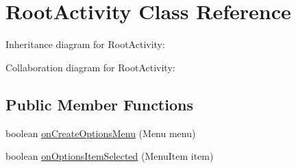 \hypertarget{classcom_1_1axcoto_1_1shinjuku_1_1sushi_1_1_root_activity}{\section{\-Root\-Activity \-Class \-Reference}
\label{classcom_1_1axcoto_1_1shinjuku_1_1sushi_1_1_root_activity}
}


\-Inheritance diagram for \-Root\-Activity\-:


\-Collaboration diagram for \-Root\-Activity\-:
\subsection*{\-Public \-Member \-Functions}
\begin{DoxyCompactItemize}
\item 
boolean \hyperlink{classcom_1_1axcoto_1_1shinjuku_1_1sushi_1_1_root_activity_a8f7d87763ddaf085205a54e8477ecfce}{on\-Create\-Options\-Menu} (\-Menu menu)
\item 
boolean \hyperlink{classcom_1_1axcoto_1_1shinjuku_1_1sushi_1_1_root_activity_a37a55c533c74b60c0290ef1329d74e65}{on\-Options\-Item\-Selected} (\-Menu\-Item item)
\end{DoxyCompactItemize}


